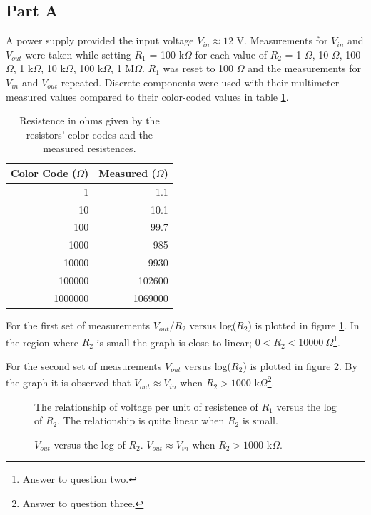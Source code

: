 \documentclass[11pt,onecolumn]{article}
\begin{document}
\subsection{Part A}
A power supply provided the input voltage $V_{in} \approx 12$ V. Measurements for $V_{in}$ and $V_{out}$ were taken while setting $R_1$ = 100 k$\Omega$ for each value of $R_2$ = 1 $\Omega$, 10 $\Omega$, 100 $\Omega$, 1 k$\Omega$, 10 k$\Omega$, 100 k$\Omega$, 1 M$\Omega$. $R_1$ was reset to 100 $\Omega$ and the measurements for $V_{in}$ and $V_{out}$ repeated. Discrete components were used with their multimeter-measured values compared to their color-coded values in table \ref{fig:Resistors}.
\begin{table}
\begin{center}
\begin{tabular}{|r|r|}
\hline
Color Code ($\Omega$)	& Measured ($\Omega$) \\
\hline
1			& 1.1 \\
10			& 10.1 \\
100			& 99.7 \\
1000			& 985 \\
10000			& 9930 \\
100000			& 102600 \\
1000000			& 1069000 \\
\hline
\end{tabular}
\end{center}
\caption{Resistence in ohms given by the resistors' color codes and the measured resistences.}\label{fig:Resistors}
\end{table}

For the first set of measurements $V_{out} / R_2$ versus log($R_2$) is plotted in figure \ref{fig:plot01}. In the region where $R_2$ is small the graph is close to linear; $0 < R_2 < 10000\ \Omega$\footnote{Answer to question two.}.

For the second set of measurements $V_{out}$ versus log($R_2$) is plotted in figure \ref{fig:plot02}. By the graph it is observed that $V_{out} \approx V_{in}$ when $R_2 > 1000$ k$\Omega$\footnote{Answer to question three.}.

\begin{figure}

\caption{The relationship of voltage per unit of resistence of $R_1$ versus the log of $R_2$. The relationship is quite linear when $R_2$ is small.}\label{fig:plot01}
\end{figure}

\begin{figure}

\caption{$V_{out}$ versus the log of $R_2$. $V_{out} \approx V_{in}$ when $R_2 > 1000$ k$\Omega$.}\label{fig:plot02}
\end{figure}
\end{document}
